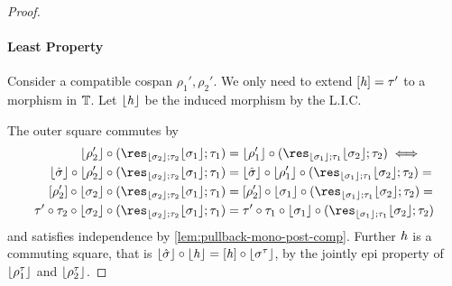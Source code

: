 \begin{proof}
    \paragraph{Least Property}
    Consider a compatible cospan $\rho_1', \rho_2'$.
    We only need to extend $[\mathit{h}] = \tau'$ to a morphism in $\mathbb{T}$.
    Let $\lfloor\mathit{h}\rfloor$ be the induced morphism by the L.I.C.
    \begin{center}
    \end{center}
    The outer square commutes by
    \begin{align*}
        \concL{\rho_2'} \comp (\res_{\concL{\sigma_2};\tau_2}\concL{\sigma_1};\tau_1) & = \concL{\rho_1'} \comp (\res_{\concL{\sigma_1};\tau_1}\concL{\sigma_2};\tau_2) \iff \\
        \concL{\hat\sigma} \comp \concL{\rho_2'} \comp (\res_{\concL{\sigma_2};\tau_2}\concL{\sigma_1};\tau_1) & = \concL{\hat\sigma} \comp \concL{\rho_1'} \comp (\res_{\concL{\sigma_1};\tau_1}\concL{\sigma_2};\tau_2) = \\
        \anyL{\rho_2'} \comp \concL{\sigma_2} \comp (\res_{\concL{\sigma_2};\tau_2}\concL{\sigma_1};\tau_1) & = \anyL{\rho_2'} \comp \concL{\sigma_1} \comp (\res_{\concL{\sigma_1};\tau_1}\concL{\sigma_2};\tau_2) = \\
        \tau' \comp \tau_2 \comp \concL{\sigma_2} \comp (\res_{\concL{\sigma_2};\tau_2}\concL{\sigma_1};\tau_1) & = \tau' \comp \tau_1 \comp \concL{\sigma_1} \comp (\res_{\concL{\sigma_1};\tau_1}\concL{\sigma_2};\tau_2)
    \end{align*}
    and satisfies independence by \cref{lem:pullback-mono-post-comp}.
    Further $\mathit{h}$ is a commuting square, that is $\lfloor\hat\sigma\rfloor \circ \lfloor\mathit{h}\rfloor = [\mathit{h}] \circ \lfloor\sigma^\tau\rfloor$, by the jointly epi property of $\lfloor\rho^\tau_1\rfloor$ and $\lfloor\rho^\tau_2\rfloor$.
\end{proof}

